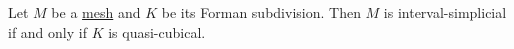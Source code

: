 \begin{proposition}
  Let
    $M$ be a \hyperref[idec:mesh:definition]{mesh}
    and $K$ be its Forman subdivision.
  Then $M$ is interval-simplicial if and only if $K$ is quasi-cubical.
\end{proposition}
